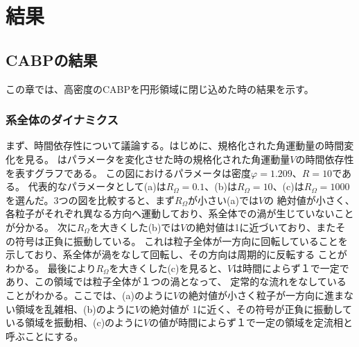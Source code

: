 \documentclass[/Users/ikedahajime/GitHub/reserch/master_report/thesis]{subfiles}
\begin{document}
\chapter{結果}
\section{CABPの結果}
この章では、高密度のCABPを円形領域に閉じ込めた時の結果を示す。%
\subsection{系全体のダイナミクス}\label{subsec:CABPdinamicse}
まず、時間依存性について議論する。はじめに、規格化された角運動量の時間変化を見る。
はパラメータを変化させた時の規格化された角運動量$V$の時間依存性を表すグラフである。
この図におけるパラメータは密度$\varphi=1.209$、$R=10$である。
代表的なパラメータとして(a)は$R_{\Omega}=0.1$、(b)は$R_{\Omega}=10$、(c)は$R_{\Omega}=1000$
を選んだ。3つの図を比較すると、まず$R_{\Omega}$が小さい(a)では$V$の
絶対値が小さく、各粒子がそれぞれ異なる方向へ運動しており、系全体での渦が生じていないことが分かる。
次に$R_{\Omega}$を大きくした(b)では$V$の絶対値は1に近づいており、またその符号は正負に振動している。%
これは粒子全体が一方向に回転していることを示しており、系全体が渦をなして回転し、その方向は周期的に反転する
ことがわかる。
最後により$R_{\Omega}$を大きくした(c)を見ると、$V$は時間によらず１で一定であり、この領域では粒子全体が１つの渦となって、
定常的な流れをなしていることがわかる。ここでは、(a)のように$V$の絶対値が小さく粒子が一方向に進まない領域を乱雑相、(b)のように$V$の絶対値が
1に近く、その符号が正負に振動している領域を振動相、(c)のように$V$の値が時間によらず１で一定の領域を定流相と呼ぶことにする。\\
\end{document}
